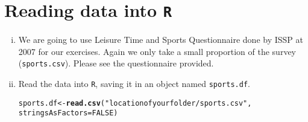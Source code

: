 \documentclass[12pt,a4paper]{article}\usepackage[]{graphicx}\usepackage[]{color}
\makeatletter
\newcommand{\hlnum}[1]{\textcolor[rgb]{0.686,0.059,0.569}{#1}}%
\newcommand{\hlstr}[1]{\textcolor[rgb]{0.192,0.494,0.8}{#1}}%
\newcommand{\hlstd}[1]{\textcolor[rgb]{0.345,0.345,0.345}{#1}}%
\newcommand{\hlkwb}[1]{\textcolor[rgb]{0.69,0.353,0.396}{#1}}%
\newcommand{\hlkwc}[1]{\textcolor[rgb]{0.333,0.667,0.333}{#1}}%
\newcommand{\hlkwd}[1]{\textcolor[rgb]{0.737,0.353,0.396}{\textbf{#1}}}%
\newenvironment{kframe}{%
 \def\at@end@of@kframe{}%
 \ifinner\ifhmode%
  \def\at@end@of@kframe{\end{minipage}}%
  \begin{minipage}{\columnwidth}%
 \fi\fi%
 \def\FrameCommand##1{\hskip\@totalleftmargin \hskip-\fboxsep
 \colorbox{shadecolor}{##1}\hskip-\fboxsep
     \hskip-\linewidth \hskip-\@totalleftmargin \hskip\columnwidth}%
 \MakeFramed {\advance\hsize-\width
   \@totalleftmargin\z@ \linewidth\hsize
   \@setminipage}}%
 {\par\unskip\endMakeFramed%
 \at@end@of@kframe}
\newenvironment{knitrout}{}{} %
\makeatother
\begin{document}
\section{Reading data into \texttt{R}}
\label{sec:read}

\begin{enumerate}[(i)]

\item We are going to use Leisure Time and Sports Questionnaire done
  by ISSP at 2007 for our exercises. Again we only take a small
  proportion of the survey (\texttt{sports.csv}). Please see the
  questionnaire provided.
\item Read the data into \texttt{R}, saving it in an object named
  \texttt{sports.df}.
\begin{knitrout}
\color{fgcolor}\begin{kframe}
\begin{alltt}
\hlstd{sports.df} \hlkwb{<-} \hlkwd{read.csv}\hlstd{(}\hlstr{"location of your folder/sports.csv"}\hlstd{,}
                      \hlkwc{stringsAsFactors} \hlstd{=} \hlnum{FALSE}\hlstd{)}
\end{alltt}
\end{kframe}
\end{knitrout}


\end{enumerate}
\end{document}
